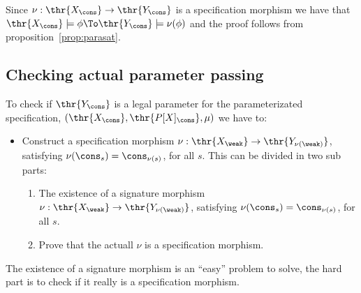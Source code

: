 \begin{PROOF} %
Since $\nu: \thr{X_\cons} \to \thr{Y_\cons}$ is a specification morphism we have that $\thr{X_\cons} \models \phi \To \thr{Y_\cons} \models \nu(\phi)$ and the proof follows from proposition~\ref{prop:parasat}.
\end{PROOF}


\subsection{Checking actual parameter passing}

To check if $\thr{Y_\cons}$ is a legal parameter for the parameterizated specification, $(\thr{X_\cons}, \thr{P[X]_\cons}, \mu)$ we have to:
	\begin{itemize}
	\item Construct a specification morphism $\nu: \thr{X_\weak} \to \thr{Y_{\nu(\weak)}}$, satisfying $\nu(\cons_s)= \cons_{\nu(s)}$, for all $s$. 
	This can be divided in two sub parts:
		\begin{enumerate}
		\item The existence of a signature morphism $\nu: \thr{X_\weak} \to \thr{Y_{\nu(\weak)}}$, satisfying $\nu(\cons_s)= \cons_{\nu(s)}$, for all $s$. 
		\item Prove that the actuall $\nu$ is a specification morphism.
		\end{enumerate}
	\end{itemize}
The existence of a signature morphism is an ``easy'' problem to solve, the hard part is to check if it really is a specification morphism.




